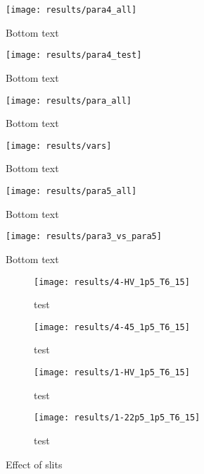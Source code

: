 \begin{figure}
    \centering
    \texttt{[image: results/para4\_all]}
    \caption{Bottom text}
    \label{fig:para4_all}
\end{figure}

\begin{figure}
    \centering
    \texttt{[image: results/para4\_test]}
    \caption{Bottom text}
    \label{fig:para4_test}
\end{figure}

\begin{figure}
    \centering
    \texttt{[image: results/para\_all]}
    \caption{Bottom text}
    \label{fig:para_all}
\end{figure}

\begin{figure}
    \centering
    \texttt{[image: results/vars]}
    \caption{Bottom text}
    \label{fig:para_vars}
\end{figure}

\begin{figure}
    \centering
    \texttt{[image: results/para5\_all]}
    \caption{Bottom text}
    \label{fig:para5_all}
\end{figure}

\begin{figure}
    \centering
    \texttt{[image: results/para3\_vs\_para5]}
    \caption{Bottom text}
    \label{fig:para3_vs_para5}
\end{figure}

\begin{figure}
    \centering
    \begin{subfigure}[b]{0.45\textwidth}
        \centering
        \texttt{[image: results/4-HV\_1p5\_T6\_15]}
        \caption{test}
        \label{fig:y equals x}
    \end{subfigure}
    \begin{subfigure}[b]{0.45\textwidth}
        \centering
        \texttt{[image: results/4-45\_1p5\_T6\_15]}
        \caption{test}
        \label{fig:three sin x}
    \end{subfigure}
    \begin{subfigure}[b]{0.45\textwidth}
        \centering
        \texttt{[image: results/1-HV\_1p5\_T6\_15]}
        \caption{test}
        \label{fig:five over x}
    \end{subfigure}
    \begin{subfigure}[b]{0.45\textwidth}
        \centering
        \texttt{[image: results/1-22p5\_1p5\_T6\_15]}
        \caption{test}
        \label{fig:blah}
    \end{subfigure}
       \caption{Effect of slits}
       \label{fig:effect_slit}
\end{figure}